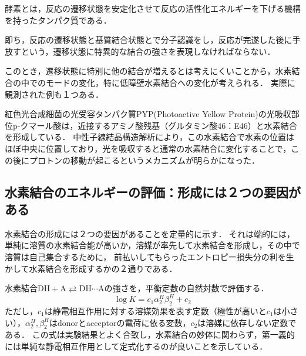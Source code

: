 \documentclass[uplatex, dvipdfmx]{jsreport}
\begin{document}
\begin{definition}[酵素]
    酵素とは，反応の遷移状態を安定化させて反応の活性化エネルギーを下げる機構を持ったタンパク質である．

    即ち，反応の遷移状態と基質結合状態とで分子認識をし，反応が完遂した後に手放すという，遷移状態に特異的な結合の強さを表現しなければならない．
\end{definition}
\begin{example}[酵素が基質との結合に水素結合が関わる場合]
    このとき，遷移状態に特別に他の結合が増えるとは考えにくいことから，水素結合の中でのモードの変化，特に低障壁水素結合への変化が考えられる．
    実際に観測された例も１つある．

    紅色光合成細菌の光受容タンパク質PYP(Photoactive Yellow Protein)の光吸収部位p-クマール酸は，近接するアミノ酸残基（グルタミン酸46：E46）と水素結合を形成している．
    中性子線結晶構造解析により，この水素結合で水素の位置はほぼ中央に位置しており，光を吸収すると通常の水素結合に変化することで，この後にプロトンの移動が起こるというメカニズムが明らかになった．
\end{example}

\subsection{水素結合のエネルギーの評価：形成には２つの要因がある}
\begin{screen}
    水素結合の形成には２つの要因があることを定量的に示す．
それは端的には，単純に溶質の水素結合能が高いか，溶媒が率先して水素結合を形成し，その中で溶質は自己集合するために，
前払いしてもらったエントロピー損失分の利を生かして水素結合を形成するかの２通りである．
\end{screen}

\begin{theory}
    水素結合$\mathrm{DH}+\mathrm{A}\rightleftarrows\mathrm{DH\cdots A}$の強さを，平衡定数の自然対数で評価する．
    \[ \log K=c_1\alpha_2^H\beta_2^H+c_2 \]
    ただし，$c_1$は静電相互作用に対する溶媒効果を表す定数（極性が高いと$c_1$は小さい），$\alpha_2^H,\beta_2^H$はdonorとacceptorの電荷に依る変数，$c_2$は溶媒に依存しない定数である．
    この式は実験結果とよく合致し，水素結合の妙体に関わらず，第一義的には単純な静電相互作用として定式化するのが良いことを示している．
\end{theory}
\end{document}
